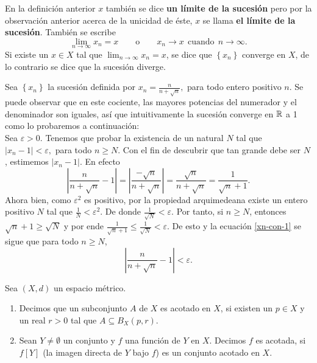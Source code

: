 En la definición anterior $x$ también se dice \textbf{un límite de la sucesión} pero por la observación anterior acerca de la unicidad de éste, $x$ se llama \textbf{el límite de la sucesión}. También se escribe \[\lim_{n\to \infty}x_n=x \qquad \text{o} \qquad x_n\to x \ \ \text{cuando} \ \ n\to \infty .\]   Si existe un $x\in X$ tal que $\lim_{n\to \infty}x_n=x$, se dice que $\left\{x_n \right\}$ converge en $X$, de lo contrario se dice que la sucesión diverge.

 \begin{example}
 Sea $\left\{x_n \right\}$ la sucesión definida por $x_n=\frac{n}{n+\sqrt{n}},$ para todo entero positivo $n$. Se puede observar que en este cociente, las mayores potencias del numerador y el denominador son iguales, así que intuitivamente la sucesión converge en $\mathbb{R}$ a 1 como lo probaremos a continuación:\\
 Sea $\varepsilon>0.$ Tenemos que probar la existencia de un natural $N$ tal que $|x_n-1|<\varepsilon,$ para todo $n\geq N$. Con el fin de descubrir que tan grande debe ser $N$, estimemos $|x_n-1|$. En efecto
 \begin{equation}\label{xn-con-1}
     \left| \frac{n}{n+\sqrt{n}}-1 \right| = \left| \frac{-\sqrt{n}}{n+\sqrt{n}}\right|=\frac{\sqrt{n}}{n+\sqrt{n}}=\frac{1}{\sqrt{n}+1} .
 \end{equation}
Ahora bien, como $ \varepsilon ^2$ es positivo, por la propiedad arquimedeana existe un entero positivo $N$ tal que $\frac{1}N < \varepsilon^2$. De donde $\frac{1}{\sqrt{N}}<\varepsilon.$ Por tanto, si $n\geq N$, entonces $\sqrt{n}+1 \geq \sqrt{N}$ y por ende $\frac{1}{\sqrt{n}+1}\leq \frac{1}{\sqrt{N}}<\varepsilon.$ De esto y la ecuación  \eqref{xn-con-1} se sigue que para todo $n\geq N$, \[\left| \frac{n}{n+\sqrt{n}}-1 \right| <\varepsilon.\]
 \end{example}



\begin{definicion}
    Sea $(X,d)$ un espacio métrico.
    \begin{enumerate}
        \item Decimos que un subconjunto $A$ de $X$ es acotado en $X$, si existen un $p\in X$ y un real $r>0$ tal que $A\subseteq B_X(p, r).$
        \item Sean  $Y\neq \emptyset$ un conjunto y $f$ una función de $Y$ en $X$. Decimos $f$ es acotada, si $f[Y]$ (la imagen directa de $Y$ bajo $f$) es un conjunto acotado en $X$.
    \end{enumerate}
\end{definicion}

